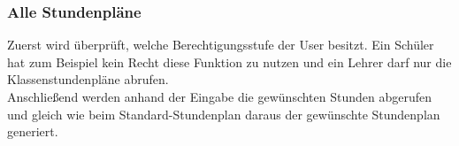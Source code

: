 \subsubsection{Alle Stundenpläne}
Zuerst wird überprüft, welche Berechtigungsstufe der User besitzt. Ein Schüler hat zum Beispiel kein Recht diese Funktion zu nutzen und ein Lehrer darf nur die Klassenstundenpläne abrufen.\\
Anschließend werden anhand der Eingabe die gewünschten Stunden abgerufen und gleich wie beim Standard-Stundenplan daraus der gewünschte Stundenplan generiert.